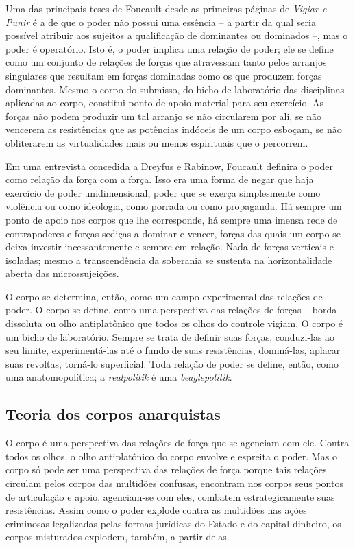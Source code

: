 Uma das principais teses de Foucault desde as primeiras páginas de
\emph{Vigiar e Punir} é a de que o poder não possui uma essência -- a
partir da qual seria possível atribuir aos sujeitos a qualificação de
dominantes ou dominados --, mas o poder é operatório. Isto é, o poder
implica uma relação de poder; ele se define como um conjunto de relações
de forças que atravessam tanto pelos arranjos singulares que resultam em
forças dominadas como os que produzem forças dominantes. Mesmo o corpo
do submisso, do bicho de laboratório das disciplinas aplicadas ao corpo,
constitui ponto de apoio material para seu exercício. As forças não
podem produzir um tal arranjo se não circularem por ali, se não vencerem
as resistências que as potências indóceis de um corpo esboçam, se não
obliterarem as virtualidades mais ou menos espirituais que o percorrem.

Em uma entrevista concedida a Dreyfus e Rabinow, Foucault definira o
poder como relação da força com a força. Isso era uma forma de negar que
haja exercício de poder unidimensional, poder que se exerça simplesmente
como violência ou como ideologia, como porrada ou como propaganda. Há
sempre um ponto de apoio nos corpos que lhe corresponde, há sempre uma
imensa rede de contrapoderes e forças sediças a dominar e vencer, forças
das quais um corpo se deixa investir incessantemente e sempre em
relação. Nada de forças verticais e isoladas; mesmo a transcendência da
soberania se sustenta na horizontalidade aberta das microssujeições.

O corpo se determina, então, como um campo experimental das relações de
poder. O corpo se define, como uma perspectiva das relações de forças --
borda dissoluta ou olho antiplatônico que todos os olhos do controle
vigiam. O corpo é um bicho de laboratório. Sempre se trata de definir
suas forças, conduzi-las ao seu limite, experimentá-las até o fundo de
suas resistências, dominá-las, aplacar suas revoltas, torná-lo
superficial. Toda relação de poder se define, então, como uma
anatomopolítica; a \emph{realpolitik }é uma \emph{beaglepolitik}.

\subsection{Teoria dos corpos anarquistas}

O corpo é uma perspectiva das
relações de força que se agenciam com ele. Contra todos os olhos, o olho
antiplatônico do corpo envolve e espreita o poder. Mas o corpo só pode
ser uma perspectiva das relações de força porque tais relações circulam
pelos corpos das multidões confusas, encontram nos corpos seus pontos de
articulação e apoio, agenciam-se com eles, combatem estrategicamente
suas resistências. Assim como o poder explode contra as multidões nas
ações criminosas legalizadas pelas formas jurídicas do Estado e do
capital-dinheiro, os corpos misturados explodem, também, a partir delas.

